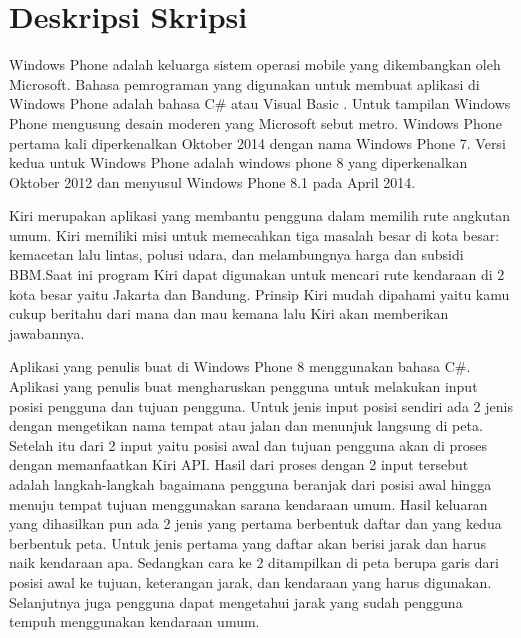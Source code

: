 \documentclass[a4paper,twoside]{article}
\begin{document}
\title{\@judultopik}
\author{\nama \textendash \@npm} 

\newcommand{\nama}{Yohan}
\newcommand{\@npm}{2011730048}
\newcommand{\@judultopik}{Pengembangan Aplikasi Pencari Rute Kendaraan Umum Untuk Kendaraan Umum} %
\newcommand{\jumpemb}{1} %
\newcommand{\tanggal}{16/11/2014}
\maketitle


\section{Deskripsi Skripsi}
\hspace{0.5cm} Windows Phone adalah keluarga sistem operasi mobile yang dikembangkan oleh Microsoft. Bahasa pemrograman yang digunakan untuk membuat aplikasi di Windows Phone adalah bahasa C\# atau Visual Basic \footnotemark[1]. Untuk tampilan Windows Phone mengusung desain moderen yang Microsoft sebut metro. Windows Phone pertama kali diperkenalkan Oktober 2014 dengan nama Windows Phone 7. Versi kedua untuk Windows Phone adalah windows phone 8 yang diperkenalkan Oktober 2012 dan menyusul Windows Phone 8.1 pada April 2014.

Kiri merupakan aplikasi yang membantu pengguna dalam memilih rute angkutan umum. Kiri memiliki misi untuk memecahkan tiga masalah besar di kota besar: kemacetan lalu lintas, polusi udara, dan melambungnya harga dan subsidi BBM.\footnotemark[2] Saat ini program Kiri dapat digunakan untuk mencari rute kendaraan di 2 kota besar yaitu Jakarta dan Bandung. Prinsip Kiri mudah dipahami yaitu kamu cukup beritahu dari mana dan mau kemana lalu Kiri akan memberikan jawabannya.

Aplikasi yang penulis buat di Windows Phone 8 menggunakan bahasa C\#. Aplikasi yang penulis buat mengharuskan pengguna untuk melakukan input posisi pengguna dan tujuan pengguna. Untuk jenis input posisi sendiri ada 2 jenis dengan mengetikan nama tempat atau jalan dan menunjuk langsung di peta. Setelah itu dari 2 input yaitu posisi awal dan tujuan pengguna akan di proses dengan memanfaatkan Kiri API. Hasil dari proses dengan 2 input tersebut adalah langkah-langkah bagaimana pengguna beranjak dari posisi awal hingga menuju tempat tujuan menggunakan sarana kendaraan umum. Hasil keluaran yang dihasilkan pun ada 2 jenis yang pertama berbentuk daftar dan yang kedua berbentuk peta. Untuk jenis pertama yang daftar akan berisi jarak dan harus naik kendaraan apa. Sedangkan cara ke 2 ditampilkan di peta berupa garis dari posisi awal ke tujuan, keterangan jarak, dan kendaraan yang harus digunakan. Selanjutnya juga pengguna dapat mengetahui jarak yang sudah pengguna tempuh menggunakan kendaraan umum.
\end{document}
